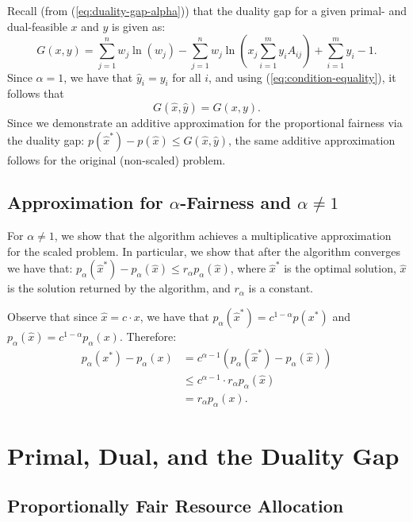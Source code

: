 \documentclass[11pt]{article}
\begin{document}
Recall (from (\ref{eq:duality-gap-alpha})) that the duality gap for a given primal- and dual-feasible $x$ and $y$ is given as:
\begin{equation*}
G(x, y) = \sum_{j=1}^nw_j\ln(w_j) - \sum_{j=1}^n w_j \ln\left(x_j\sum_{i=1}^m y_i A_{ij}\right)+\sum_{i=1}^m y_i -1.
\end{equation*}
Since $\alpha=1$, we have that $\widehat{y}_i = y_i$ for all $i$, and using (\ref{eq:condition-equality}), it follows that
\begin{equation*}
G(\widehat{x}, \widehat{y}) = G(x, y).
\end{equation*}
Since we demonstrate an additive approximation for the proportional fairness via the duality gap: $p(\widehat{x}^*) - p(\widehat{x})\leq G(\widehat{x}, \widehat{y})$, the same additive approximation follows for the original (non-scaled) problem.

\subsection{Approximation for $\alpha$-Fairness and $\alpha\neq 1$}
For $\alpha\neq 1$, we show that the algorithm achieves a multiplicative approximation for the scaled problem. In particular, we show that after the algorithm converges we have that: $p_\alpha({\widehat{x}}^*) - p_{\alpha}(\widehat{x})\leq r_\alpha p_\alpha(\widehat{x})$, where ${\widehat{x}}^*$ is the optimal solution, $\widehat{x}$ is the solution returned by the algorithm, and $r_\alpha$ is a constant.

Observe that since $\widehat{x} = c \cdot x$, we have that $p_\alpha (\widehat{x}^*) = c^{1 - \alpha}p(x^*)$ and $p_\alpha(\widehat{x}) = c^{1 - \alpha} p_\alpha(x)$. Therefore:
\begin{align*}
p_\alpha({{x}}^*) - p_{\alpha}({x}) & = c^{\alpha - 1}(p_\alpha({\widehat{x}}^*) - p_{\alpha}(\widehat{x}))\\
&\leq c^{\alpha - 1} \cdot r_\alpha p_\alpha(\widehat{x})\\
& = r_\alpha p_\alpha({x}).
\end{align*}






\section{Primal, Dual, and the Duality Gap}\label{appendix:primal-dual-duality-gap}

\subsection{Proportionally Fair Resource Allocation}
\end{document}
